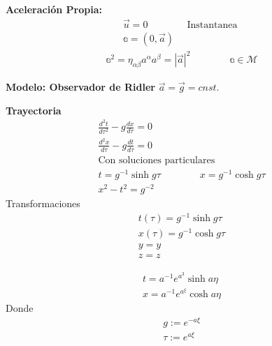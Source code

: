 \documentclass{article}
\newcommand{\caja}[3]{%
  \begin{tcolorbox}[colback=#1!5!white,colframe=#1!25!black,title=#2]
    #3
  \end{tcolorbox}%
}
\begin{document}
\textbf{Aceleración Propia: } 
\begin{gather*}
  \vec u = 0 \qquad \qquad \text{Instantanea }\\
  \mathbb{a} = (0, \vec a)
\end{gather*}
\begin{gather*}
  \mathbb a ^ {2 } = \eta _{\alpha\beta} a ^ {\alpha} a ^ {\beta} = \left|\vec a \right| ^ {2 } \qquad \qquad \mathbb a \in \mathcal M  
\end{gather*}

\textbf{Modelo: Observador de Ridler} $ \vec a = \vec g = cnst.  $

\textbf{Trayectoria } 
\begin{gather*}
  \frac{d ^2 t  }{d \tau^2 } - g \frac{d x }{d \tau }= 0 \\
  \frac{d ^2 x  }{d \tau } - g \frac{d  t  }{d \tau } = 0 \\
  \text{Con soluciones particulares }\\
  t = g ^ {-1 }\sinh{g\tau }\qquad \qquad x = g ^ {-1 } \cosh{g\tau}\\
  x^2 - t^2 = g ^ {-2 }
\end{gather*}
Transformaciones 
\begin{gather*}
  t(\tau) = g ^ {-1 } \sinh{g\tau}\\ 
  x(\tau) = g ^ {-1 } \cosh{g\tau} \\
  y = y \\
  z = z 
\end{gather*}



\caja{green}{}{
  \begin{gather*}
    t = a ^ {-1 } e ^ {a ^ {3 }} \sinh{a\eta}\\
    x = a ^ {-1 } e ^ {a ^ {\xi }} \cosh{a\eta}
  \end{gather*}
  Donde 
  \begin{gather*}
    g:=  e ^ {-a \xi }\\
    \tau:=  e ^ {a \xi }
  \end{gather*}
}
\end{document}
